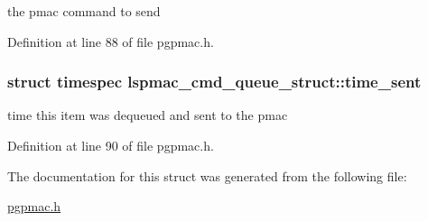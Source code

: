 the pmac command to send 



Definition at line 88 of file pgpmac.\-h.

\hypertarget{structlspmac__cmd__queue__struct_a276ebc4b35c2554e4cb7377b60fd89b7}{
\subsubsection[{time\-\_\-sent}]{\setlength{\rightskip}{0pt plus 5cm}struct timespec lspmac\-\_\-cmd\-\_\-queue\-\_\-struct\-::time\-\_\-sent}}\label{structlspmac__cmd__queue__struct_a276ebc4b35c2554e4cb7377b60fd89b7}


time this item was dequeued and sent to the pmac 



Definition at line 90 of file pgpmac.\-h.



The documentation for this struct was generated from the following file\-:\begin{DoxyCompactItemize}
\item 
\hyperlink{pgpmac_8h}{pgpmac.\-h}\end{DoxyCompactItemize}
